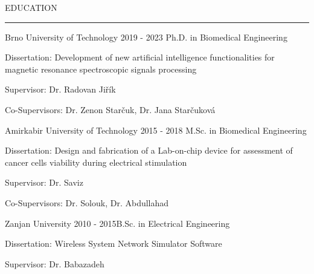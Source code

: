 \documentclass{resume} %
\renewenvironment{rSection}[1]{
\sectionskip
\textcolor{RoyalPurple}{\MakeUppercase{#1}}
\sectionlineskip
\hrule
\begin{list}{}{
\setlength{\leftmargin}{1.5em}
}
\item[]
}{
\end{list}
}
\begin{document}
\begin{rSection}{Education}


\begin{rSubsection}{ Brno University of Technology} {2019 - 2023} {Ph.D. in Biomedical Engineering}{}
\item Dissertation: Development of new artificial intelligence functionalities for magnetic resonance spectroscopic signals processing
\item Supervisor: Dr. Radovan Jiřík 
\item Co-Supervisors: Dr. Zenon Starčuk, Dr. Jana Starčuková
\end{rSubsection}

\begin{rSubsection}{ Amirkabir University of Technology} {2015 - 2018} {M.Sc. in Biomedical Engineering} {}{}
\item Dissertation: Design and fabrication of a Lab-on-chip device for assessment of cancer cells viability during electrical stimulation
\item Supervisor: Dr. Saviz
\item Co-Supervisors: Dr. Solouk, Dr. Abdullahad
\end{rSubsection}

\begin{rSubsection}{ Zanjan University} {2010 - 2015}{B.Sc. in Electrical Engineering}{}
\item Dissertation: Wireless System Network Simulator Software
\item Supervisor: Dr. Babazadeh
\end{rSubsection}



\end{rSection}


\end{document}
